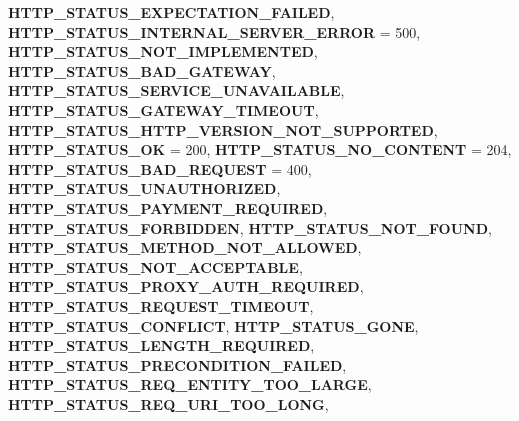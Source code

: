 \begin{DoxyCompactItemize}
{\bfseries H\+T\+T\+P\+\_\+\+S\+T\+A\+T\+U\+S\+\_\+\+E\+X\+P\+E\+C\+T\+A\+T\+I\+O\+N\+\_\+\+F\+A\+I\+L\+ED}, 
\newline
{\bfseries H\+T\+T\+P\+\_\+\+S\+T\+A\+T\+U\+S\+\_\+\+I\+N\+T\+E\+R\+N\+A\+L\+\_\+\+S\+E\+R\+V\+E\+R\+\_\+\+E\+R\+R\+OR} = 500, 
{\bfseries H\+T\+T\+P\+\_\+\+S\+T\+A\+T\+U\+S\+\_\+\+N\+O\+T\+\_\+\+I\+M\+P\+L\+E\+M\+E\+N\+T\+ED}, 
{\bfseries H\+T\+T\+P\+\_\+\+S\+T\+A\+T\+U\+S\+\_\+\+B\+A\+D\+\_\+\+G\+A\+T\+E\+W\+AY}, 
{\bfseries H\+T\+T\+P\+\_\+\+S\+T\+A\+T\+U\+S\+\_\+\+S\+E\+R\+V\+I\+C\+E\+\_\+\+U\+N\+A\+V\+A\+I\+L\+A\+B\+LE}, 
\newline
{\bfseries H\+T\+T\+P\+\_\+\+S\+T\+A\+T\+U\+S\+\_\+\+G\+A\+T\+E\+W\+A\+Y\+\_\+\+T\+I\+M\+E\+O\+UT}, 
{\bfseries H\+T\+T\+P\+\_\+\+S\+T\+A\+T\+U\+S\+\_\+\+H\+T\+T\+P\+\_\+\+V\+E\+R\+S\+I\+O\+N\+\_\+\+N\+O\+T\+\_\+\+S\+U\+P\+P\+O\+R\+T\+ED}, 
{\bfseries H\+T\+T\+P\+\_\+\+S\+T\+A\+T\+U\+S\+\_\+\+OK} = 200, 
{\bfseries H\+T\+T\+P\+\_\+\+S\+T\+A\+T\+U\+S\+\_\+\+N\+O\+\_\+\+C\+O\+N\+T\+E\+NT} = 204, 
\newline
{\bfseries H\+T\+T\+P\+\_\+\+S\+T\+A\+T\+U\+S\+\_\+\+B\+A\+D\+\_\+\+R\+E\+Q\+U\+E\+ST} = 400, 
{\bfseries H\+T\+T\+P\+\_\+\+S\+T\+A\+T\+U\+S\+\_\+\+U\+N\+A\+U\+T\+H\+O\+R\+I\+Z\+ED}, 
{\bfseries H\+T\+T\+P\+\_\+\+S\+T\+A\+T\+U\+S\+\_\+\+P\+A\+Y\+M\+E\+N\+T\+\_\+\+R\+E\+Q\+U\+I\+R\+ED}, 
{\bfseries H\+T\+T\+P\+\_\+\+S\+T\+A\+T\+U\+S\+\_\+\+F\+O\+R\+B\+I\+D\+D\+EN}, 
\newline
{\bfseries H\+T\+T\+P\+\_\+\+S\+T\+A\+T\+U\+S\+\_\+\+N\+O\+T\+\_\+\+F\+O\+U\+ND}, 
{\bfseries H\+T\+T\+P\+\_\+\+S\+T\+A\+T\+U\+S\+\_\+\+M\+E\+T\+H\+O\+D\+\_\+\+N\+O\+T\+\_\+\+A\+L\+L\+O\+W\+ED}, 
{\bfseries H\+T\+T\+P\+\_\+\+S\+T\+A\+T\+U\+S\+\_\+\+N\+O\+T\+\_\+\+A\+C\+C\+E\+P\+T\+A\+B\+LE}, 
{\bfseries H\+T\+T\+P\+\_\+\+S\+T\+A\+T\+U\+S\+\_\+\+P\+R\+O\+X\+Y\+\_\+\+A\+U\+T\+H\+\_\+\+R\+E\+Q\+U\+I\+R\+ED}, 
\newline
{\bfseries H\+T\+T\+P\+\_\+\+S\+T\+A\+T\+U\+S\+\_\+\+R\+E\+Q\+U\+E\+S\+T\+\_\+\+T\+I\+M\+E\+O\+UT}, 
{\bfseries H\+T\+T\+P\+\_\+\+S\+T\+A\+T\+U\+S\+\_\+\+C\+O\+N\+F\+L\+I\+CT}, 
{\bfseries H\+T\+T\+P\+\_\+\+S\+T\+A\+T\+U\+S\+\_\+\+G\+O\+NE}, 
{\bfseries H\+T\+T\+P\+\_\+\+S\+T\+A\+T\+U\+S\+\_\+\+L\+E\+N\+G\+T\+H\+\_\+\+R\+E\+Q\+U\+I\+R\+ED}, 
\newline
{\bfseries H\+T\+T\+P\+\_\+\+S\+T\+A\+T\+U\+S\+\_\+\+P\+R\+E\+C\+O\+N\+D\+I\+T\+I\+O\+N\+\_\+\+F\+A\+I\+L\+ED}, 
{\bfseries H\+T\+T\+P\+\_\+\+S\+T\+A\+T\+U\+S\+\_\+\+R\+E\+Q\+\_\+\+E\+N\+T\+I\+T\+Y\+\_\+\+T\+O\+O\+\_\+\+L\+A\+R\+GE}, 
{\bfseries H\+T\+T\+P\+\_\+\+S\+T\+A\+T\+U\+S\+\_\+\+R\+E\+Q\+\_\+\+U\+R\+I\+\_\+\+T\+O\+O\+\_\+\+L\+O\+NG}, 

\end{DoxyCompactItemize}
